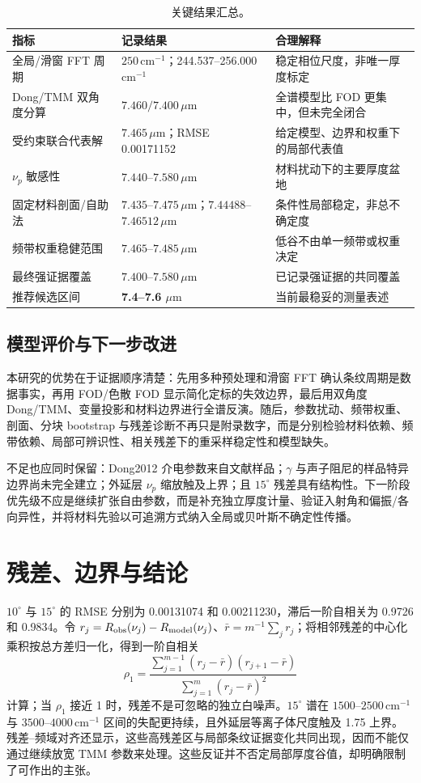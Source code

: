 \documentclass[10pt,a4paper]{ctexart}
\newcommand{\um}{\ensuremath{\mu\mathrm{m}}}
\newcommand{\wn}{\ensuremath{\mathrm{cm}^{-1}}}
\begin{document}
\begin{table}[H]\centering\small
\caption{关键结果汇总。}\label{tab:summary-cn}
\begin{tabular}{p{.35\linewidth}p{.25\linewidth}p{.29\linewidth}}\toprule
指标 & 记录结果 & 合理解释\\\midrule
全局/滑窗 FFT 周期 & $250\,\wn$；244.537--256.000 $\wn$ & 稳定相位尺度，非唯一厚度标定\\
Dong/TMM 双角度分算 & $7.460/7.400\,\um$ & 全谱模型比 FOD 更集中，但未完全闭合\\
受约束联合代表解 & $7.465\,\um$；RMSE 0.00171152 & 给定模型、边界和权重下的局部代表值\\
$\nu_p$ 敏感性 & $7.440$--$7.580\,\um$ & 材料扰动下的主要厚度盆地\\
固定材料剖面/自助法 & $7.435$--$7.475\,\um$；$7.44488$--$7.46512\,\um$ & 条件性局部稳定，非总不确定度\\
频带权重稳健范围 & $7.465$--$7.485\,\um$ & 低谷不由单一频带或权重决定\\
最终强证据覆盖 & $7.400$--$7.580\,\um$ & 已记录强证据的共同覆盖\\
推荐候选区间 & \textbf{7.4--7.6 $\um$} & 当前最稳妥的测量表述\\\bottomrule
\end{tabular}
\end{table}

\subsection{模型评价与下一步改进}
本研究的优势在于证据顺序清楚：先用多种预处理和滑窗 FFT 确认条纹周期是数据事实，再用 FOD/色散 FOD 显示简化定标的失效边界，最后用双角度 Dong/TMM、变量投影和材料边界进行全谱反演。随后，参数扰动、频带权重、剖面、分块 bootstrap 与残差诊断不再只是附录数字，而是分别检验材料依赖、频带依赖、局部可辨识性、相关残差下的重采样稳定性和模型缺失。

不足也应同时保留：Dong2012 介电参数来自文献样品；$\gamma$ 与声子阻尼的样品特异边界尚未完全建立；外延层 $\nu_p$ 缩放触及上界；且 $15^\circ$ 残差具有结构性。下一阶段优先级不应是继续扩张自由参数，而是补充独立厚度计量、验证入射角和偏振/各向异性，并将材料先验以可追溯方式纳入全局或贝叶斯不确定性传播。

\section{残差、边界与结论}
$10^\circ$ 与 $15^\circ$ 的 RMSE 分别为 0.00131074 和 0.00211230，滞后一阶自相关为 0.9726 和 0.9834。令 $r_j=R_{\rm obs}(\nu_j)-R_{\rm model}(\nu_j)$、$\bar r=m^{-1}\sum_jr_j$；将相邻残差的中心化乘积按总方差归一化，得到一阶自相关
\begin{equation}
\rho_1=\frac{\sum_{j=1}^{m-1}(r_j-\bar r)(r_{j+1}-\bar r)}
{\sum_{j=1}^{m}(r_j-\bar r)^2}
\label{eq:acf-cn}
\end{equation}
计算；当 $\rho_1$ 接近 1 时，残差不是可忽略的独立白噪声。$15^\circ$ 谱在 $1500$--$2500\,\wn$ 与 $3500$--$4000\,\wn$ 区间的失配更持续，且外延层等离子体尺度触及 1.75 上界。残差--频域对齐还显示，这些高残差区与局部条纹证据变化共同出现，因而不能仅通过继续放宽 TMM 参数来处理。这些反证并不否定局部厚度谷值，却明确限制了可作出的主张。
\end{document}
